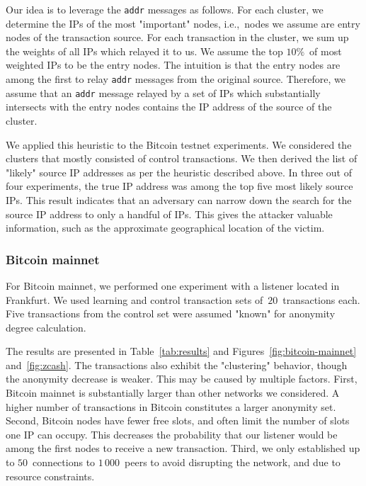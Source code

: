 Our idea is to leverage the \texttt{addr} messages as follows.
For each cluster, we determine the IPs of the most "important" nodes, i.e.,~nodes we assume are entry nodes of the transaction source.
For each transaction in the cluster, we sum up the weights of all IPs which relayed it to us.
We assume the top $10\%$~of most weighted IPs to be the entry nodes.
The intuition is that the entry nodes are among the first to relay \texttt{addr} messages from the original source.
Therefore, we assume that an \texttt{addr} message relayed by a set of IPs which substantially intersects with the entry nodes contains the IP address of the source of the cluster.

We applied this heuristic to the Bitcoin testnet experiments.
We considered the clusters that mostly consisted of control transactions.
We then derived the list of "likely" source IP addresses as per the heuristic described above.
In three out of four experiments, the true IP address was among the top five most likely source IPs.
This result indicates that an adversary can narrow down the search for the source IP address to only a handful of IPs.
This gives the attacker valuable information, such as the approximate geographical location of the victim.

\subsubsection{Bitcoin mainnet}

For Bitcoin mainnet, we performed one experiment with a listener located in Frankfurt.
We used learning and control transaction sets of~$20$~transactions each.
Five transactions from the control set were assumed "known" for anonymity degree calculation.

The results are presented in Table~\ref{tab:results} and Figures~\ref{fig:bitcoin-mainnet} and~\ref{fig:zcash}.
The transactions also exhibit the "clustering" behavior, though the anonymity decrease is weaker.
This may be caused by multiple factors.
First, Bitcoin mainnet is substantially larger than other networks we considered.
A higher number of transactions in Bitcoin constitutes a larger anonymity set.
Second, Bitcoin nodes have fewer free slots, and often limit the number of slots one IP can occupy.
This decreases the probability that our listener would be among the first nodes to receive a new transaction.
Third, we only established up to $50$~connections to $1\,000$~peers to avoid disrupting the network, and due to resource constraints.

